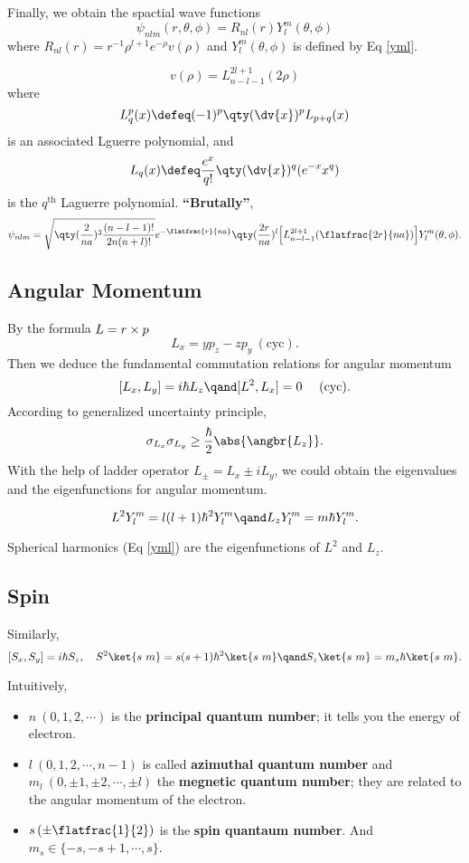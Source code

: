 Finally, we obtain the spactial wave functions
\[
	\psi_{nlm}(r,\theta,\phi)=R_{nl}(r)Y^m_l(\theta,\phi)
\] 
where $R_{nl}(r)=r^{-1}\rho^{l+1}e^{-\rho}v(\rho)$ and $Y^m_l(\theta,\phi)$ is defined by Eq \ref{yml}. 
\begin{remark}
	\[
		v(\rho)=L^{2l+1}_{n-l-1}(2\rho)
	\] 
	where
	\[
		L^p_q(x)\defeq(-1)^p\qty(\dv{x})^pL_{p+q}(x)
	\] 
	is an associated Lguerre polynomial, and
	\[
		L_q(x)\defeq\frac{e^x}{q!}\qty(\dv{x})^q(e^{-x}x^q)
	\] 
	is the $q^{\text{th}}$ Laguerre polynomial. 
	\textbf{``Brutally''},
	\[
		\psi_{nlm}=\sqrt{\qty(\frac{2}{na})^3\frac{(n-l-1)!}{2n(n+l)!}}
		e^{-\flatfrac{r}{na}}\qty(\frac{2r}{na})^l
		\Big[L^{2l+1}_{n-l-1}(\flatfrac{2r}{na})\Big]Y^m_l(\theta,\phi)
	.\]
\end{remark}

\subsection{Angular Momentum}

By the formula $\*L=\*r\times\*p$
 \[
	 L_x=yp_z-zp_y\ (\text{cyc})
.\] 
Then we deduce the fundamental commutation relations for angular momentum
\[
	[L_x,L_y]=i\hbar L_z
	\qand
	[L^2,L_x]=0
	\ \ \ \ 
	(\text{cyc})
.\] 
According to generalized uncertainty principle,
\[
	\sigma_{L_x}\sigma_{L_y}\ge \frac{\hbar}{2}\abs{\angbr{L_z}}
.\] 
With the help of ladder operator $L_\pm=L_x\pm iL_y$, we could obtain the eigenvalues and the eigenfunctions for angular momentum.
\begin{thm}
	\[
	    L^2 Y^m_l=l(l+1)\hbar^2Y^m_l
		\qand
		L_zY^m_l=m\hbar Y^m_l
	.\] 
\end{thm}
\begin{remark}
	Spherical harmonics (Eq \ref{yml}) are the eigenfunctions of $L^2$ and $L_z$.
\end{remark}

\subsection{Spin}

Similarly, 
\[
    [S_x,S_y]=i\hbar S_z,\ \ \ 
	S^2\ket{s\ m}=s(s+1)\hbar^2\ket{s\ m}
	\qand
	S_z\ket{s\ m}=m_s\hbar\ket{s\ m}
.\] 

\begin{defi}
	Intuitively,
	 \begin{itemize}
		\item 
			$n\ (0,1,2,\cdots)$ is the \textbf{principal quantum number}; it tells you the energy of electron.
		\item
			$l\ (0,1,2,\cdots,n-1)$ is called  \textbf{azimuthal quantum number} and $m_l\ (0,\pm1,\pm2,\cdots,\pm l)$ the \textbf{megnetic quantum number}; they are related to the angular momentum of the electron.
		\item
			$s\, (\pm\flatfrac{1}{2})$ is the \textbf{spin quantaum number}. And $m_s\in\{-s,-s+1,\cdots,s\}$.
	\end{itemize}
\end{defi}
